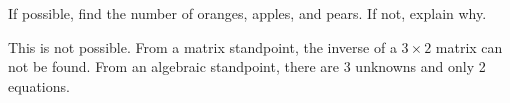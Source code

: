 If possible, find the number of oranges, apples, and pears. If not, explain why.

\begin{solution}
This is not possible. From a matrix standpoint, the inverse of a $3 \times 2$ matrix can not be found. From an algebraic standpoint, there are 3 unknowns and only 2 equations.
\end{solution}
